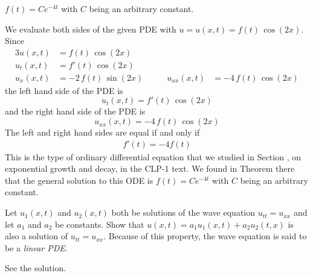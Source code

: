 \begin{answer}
$f(t) = Ce^{-4t}$ with $C$ being an arbitrary constant.
\end{answer}

\begin{solution}
We evaluate both sides of the given PDE with $u=u(x,t)=f(t)\,\cos(2x)$.
Since
\begin{alignat*}{3}
u(x,t) &=  f(t)\,\cos(2x) \\
u_t(x,t) &=  f'(t)\,\cos(2x)  \\
u_x(x,t) &= -2\,f(t)\,\sin(2x) \qquad &
u_{xx}(x,t) &=  -4\,f(t)\,\cos(2x)
\end{alignat*}
the left hand side of the PDE is
\begin{equation*}
u_t(x,t) =  f'(t)\,\cos(2x)
\end{equation*}
and the right hand side of the PDE is
\begin{equation*}
u_{xx}(x,t) =  -4\,f(t)\,\cos(2x)
\end{equation*}
The left and right hand sides are equal if and only if
\begin{align*}
f'(t)=-4 f(t)
\end{align*}
This is the type of ordinary differential equation that we studied in 
Section ,  on exponential growth and decay, 
in the CLP-1 text. We found in Theorem  
there that the general solution to this ODE is $f(t) = Ce^{-4t}$ with $C$ 
being an arbitrary constant.
\end{solution}

\begin{question}
Let $u_1(x,t)$ and $u_2(x,t)$ both be solutions of the wave equation
$u_{tt}=u_{xx}$ and let $a_1$ and $a_2$ be constants. Show that
$u(x,t)=a_1u_1(x,t)+a_2u_2(t,x)$ is also a solution of $u_{tt}=u_{xx}$.
Because of this property, the wave equation is said to be a \emph{linear PDE}.
\end{question}

%

\begin{answer}
See the solution.
\end{answer}

